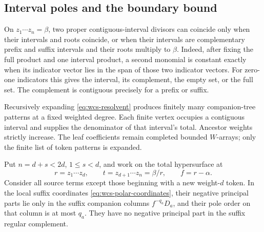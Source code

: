 \subsection{Interval poles and the boundary bound}

On \(z_1\cdots z_n=\beta\), two proper contiguous-interval
divisors can coincide only when their intervals and roots
coincide, or when their intervals are complementary prefix
and suffix intervals and their roots multiply to \(\beta\).
Indeed, after fixing the full product and one interval product,
a second monomial is constant exactly when its indicator vector
lies in the span of those two indicator vectors.  For zero-one
indicators this gives the interval, its complement, the empty
set, or the full set.  The complement is contiguous precisely
for a prefix or suffix.

Recursively expanding \eqref{eq:wcs-resolvent} produces finitely
many companion-tree patterns at a fixed weighted degree.
Each finite vertex occupies a contiguous interval and supplies
the denominator of that interval's total.  Ancestor weights
strictly increase.  The leaf coefficients remain completed
bounded \(W\)-arrays; only the finite list of token patterns
is expanded.

\begin{lemma}\label{lem:wcs-boundary-bound}
Put \(n=d+s<2d\), \(1\leq s<d\), and work on the total
hypersurface at
\[
 r=z_1\cdots z_d,\qquad t=z_{d+1}\cdots z_n=\beta/r,
 \qquad f=r-\alpha.
\]
Consider all source terms except those beginning with a new
weight-\(d\) token.  In the local suffix coordinates
\eqref{eq:wcs-polar-coordinates}, their negative principal
parts lie only in the suffix companion columns
\(f^{-q_a}D_a\), and their pole order on that column is at
most \(q_a\).  They have no negative principal part in
the suffix regular complement.
\end{lemma}

